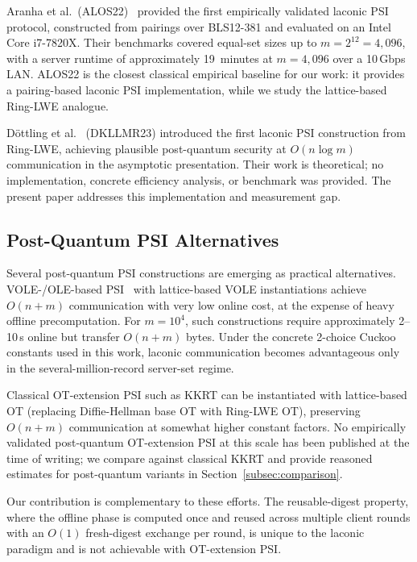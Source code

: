 \documentclass[preprint,12pt]{elsarticle}
\begin{document}
Aranha et al.\ (ALOS22)~\cite{alos2022} provided the first empirically
validated laconic PSI protocol, constructed from pairings over BLS12-381 and
evaluated on an Intel Core i7-7820X. Their benchmarks covered equal-set sizes
up to $m = 2^{12} = 4{,}096$, with a server runtime of approximately
19~minutes at $m = 4{,}096$ over a 10\,Gbps LAN. ALOS22 is the closest
classical empirical baseline for our work: it provides a pairing-based
laconic PSI implementation, while we study the lattice-based Ring-LWE
analogue.

D\"{o}ttling et al.~\cite{dottling2023laconic} (DKLLMR23) introduced the
first laconic PSI construction from Ring-LWE, achieving plausible
post-quantum security at $O(n \log m)$ communication in the asymptotic
presentation. Their work is theoretical; no implementation, concrete
efficiency analysis, or benchmark was provided. The present paper addresses
this implementation and measurement gap.

\subsection{Post-Quantum PSI Alternatives}

Several post-quantum PSI constructions are emerging as practical alternatives.
VOLE-/OLE-based PSI~\cite{garimella2023okvs,raghuraman2022blazing} with
lattice-based VOLE instantiations achieve $O(n+m)$ communication with very
low online cost, at the expense of heavy offline precomputation. For
$m=10^{4}$, such constructions require approximately 2--10\,s online but
transfer $O(n+m)$ bytes. Under the concrete 2-choice Cuckoo
constants used in this work, laconic communication becomes advantageous only
in the several-million-record server-set regime.

Classical OT-extension PSI such as KKRT can be instantiated with
lattice-based OT (replacing Diffie-Hellman base OT with Ring-LWE OT),
preserving $O(n+m)$ communication at somewhat higher constant factors. No
empirically validated post-quantum OT-extension PSI at this scale has been
published at the time of writing; we compare against classical KKRT and
provide reasoned estimates for post-quantum variants in
Section~\ref{subsec:comparison}.

Our contribution is complementary to these efforts. The reusable-digest
property, where the offline phase is computed once and reused across multiple client rounds
with an $O(1)$ fresh-digest exchange per round, is unique to the laconic
paradigm and is not achievable with OT-extension PSI.
\end{document}
